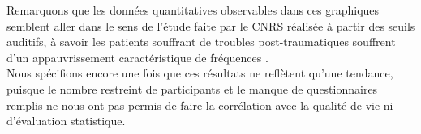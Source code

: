   
  Remarquons que les données quantitatives observables dans
  ces graphiques sem\-blent aller dans le
  sens de  l'étude faite par le
  CNRS  réalisée à partir des seuils auditifs, à savoir
  les patients souffrant de troubles post-traumatiques souffrent d'un
  appauvrissement caractéristique de fréquences \autocite{affectiveDisorders}.
    \\
     Nous spécifions 
   encore une fois  que ces résultats ne reflètent qu'une tendance, puisque le nombre restreint de 
   participants et le manque de questionnaires remplis ne nous ont pas permis de faire la corrélation avec 
   la qualité de vie ni d'évaluation statistique.	
   
  
